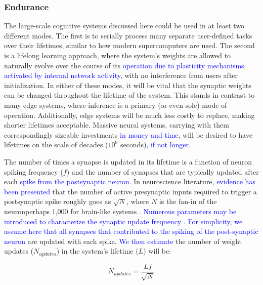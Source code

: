 \documentclass[twocolumn]{article}
\begin{document}
\subsubsection{Endurance}
The large-scale cognitive systems discussed here could be used in at least two different modes. The first is to serially process many separate user-defined tasks over their lifetimes, similar to how modern supercomputers are used. The second is a lifelong learning approach, where the system's weights are allowed to naturally evolve over the course of its \textcolor{blue}{operation due to plasticity mechanisms activated by internal network activity}, with no interference from users after initialization. In either of these modes, it will be vital that the synaptic weights can be changed throughout the lifetime of the system. This stands in contrast to many edge systems, where inference is a primary (or even sole) mode of operation. Additionally, edge systems will be much less costly to replace, making shorter lifetimes acceptable. Massive neural systems, carrying with them correspondingly sizeable investments \textcolor{blue}{in money and time}, will be desired to have lifetimes on the scale of decades ($10^9$ seconds)\textcolor{blue}{, if not longer}.

The number of times a synapse is updated in its lifetime is a function of neuron spiking frequency ($f$) and the number of synapses that are typically updated after each \textcolor{blue}{spike from the postsynaptic neuron}. In neuroscience literature, \textcolor{blue}{evidence has been presented} that the number of active presynaptic inputs required to trigger a postsynaptic spike roughly goes as $\sqrt{N}$, where $N$ is the fan-in of the neuron\textemdash perhaps 1,000 for brain-like systems \cite{vrso1996,vora2005}. \textcolor{blue}{Numerous parameters may be introduced to characterize the synaptic update frequency \cite{fuab2007}. For simplicity, we assume here that all synapses that contributed to the spiking of the post-synaptic neuron} are updated with each spike. \textcolor{blue}{We then estimate} the number of weight updates ($N_{updates}$) in the system's lifetime ($L$) will be:

\begin{equation}
    N_{updates} = \frac{Lf}{\sqrt{N}}
\end{equation}
\end{document}
